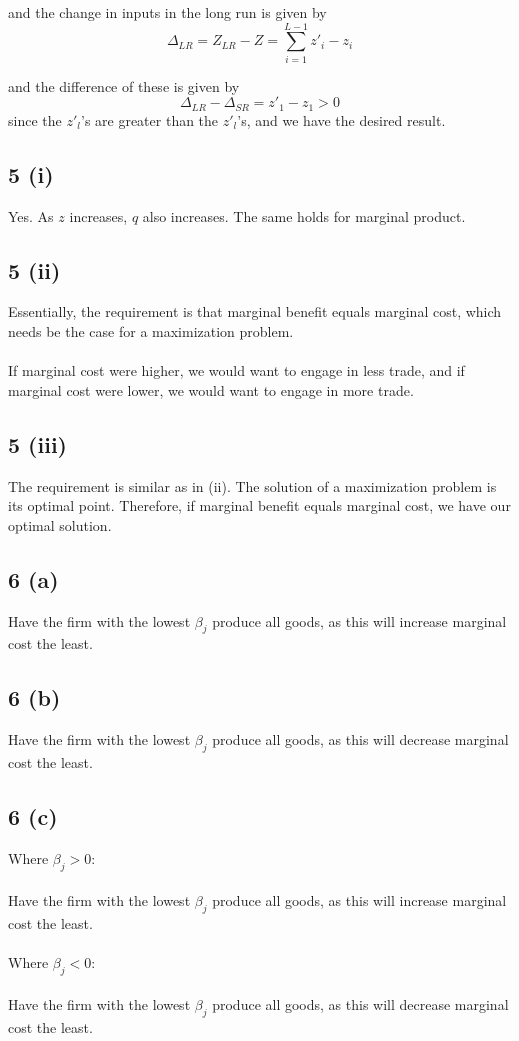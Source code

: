 \documentclass[letterpaper,12pt]{article}
\theoremstyle{definition}
\begin{document}
and the change in inputs in the long run is given by 
\[\Delta_{LR} = Z_{LR} - Z = \sum^{L-1}_{i=1} z'_i - z_i \]

and the difference of these is given by 
\[ \Delta_{LR} - \Delta_{SR} = z'_1 - z_1 > 0 \]
since the $z'_l$'s are greater than the $z'_l$'s, and we have the desired result.

\subsection*{5 (i)}
Yes. As $z$ increases, $q$ also increases. The same holds for marginal product.


\subsection*{5 (ii)}
Essentially, the requirement is that marginal benefit equals marginal cost, which needs be the case for a maximization problem.\\\\
If marginal cost were higher, we would want to engage in less trade, and if marginal cost were lower, we would want to engage in more trade.

\subsection*{5 (iii)}
The requirement is similar as in (ii). The solution of a maximization problem is its optimal point. Therefore, if marginal benefit equals marginal cost, we have our optimal solution.

\subsection*{6 (a)}

Have the firm with the lowest $\beta_j$ produce all goods, as this will increase marginal cost the least.


\subsection*{6 (b)}

Have the firm with the lowest $\beta_j$ produce all goods, as this will decrease marginal cost the least.

\subsection*{6 (c)}
Where $\beta_j > 0$:\\\\

Have the firm with the lowest $\beta_j$ produce all goods, as this will increase marginal cost the least.\\\\




Where $\beta_j < 0$:\\\\

Have the firm with the lowest $\beta_j$ produce all goods, as this will decrease marginal cost the least.
\end{document}

